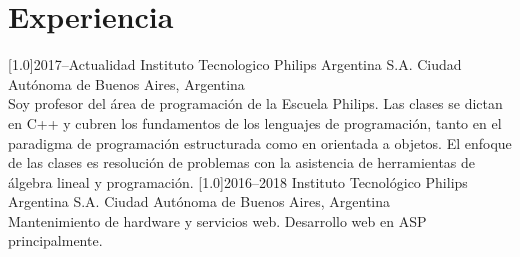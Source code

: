 \documentclass[espanol]{cv-style}     %
\begin{document}
\section{Experiencia}
  \vspace{-0.2cm}
\begin{entrylist}
\entry
  {\scalebox{.8}[1.0]{2017--Actualidad}}
  {Instituto Tecnologico Philips Argentina S.A.}
  {Ciudad Autónoma de Buenos Aires, Argentina}
  {\\
  Soy profesor del área de programación de la Escuela Philips. Las clases se dictan en C++ y cubren los fundamentos de los lenguajes de programación, tanto en el paradigma de programación estructurada como en orientada a objetos. El enfoque de las clases es resolución de problemas con la asistencia de herramientas de álgebra lineal y programación.}
\vspace{-0.3cm}
\entry
  {\scalebox{.8}[1.0]{2016--2018}}
  {Instituto Tecnológico Philips Argentina S.A.}
  {Ciudad Autónoma de Buenos Aires, Argentina}
  {\\
     Mantenimiento de hardware y servicios web. Desarrollo web en ASP principalmente.}
   
\end{entrylist}
\end{document}
